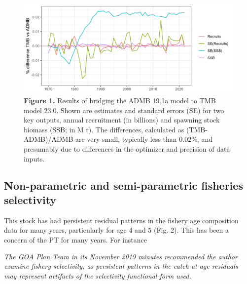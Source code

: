 \documentclass[
]{article}
\begin{document}
\begin{figure}
\centering
\includegraphics{Results/Figure1_time_series_of_se.png}
\caption{\textbf{Figure 1.} Results of bridging the ADMB 19.1a model to
TMB model 23.0. Shown are estimates and standard errors (SE) for two key
outputs, annual recruitment (in billions) and spawning stock biomass
(SSB; in M t). The differences, calculated as (TMB-ADMB)/ADMB are very
small, typically less than 0.02\%, and presumably due to differences in
the optimizer and precision of data inputs.}
\end{figure}

\hypertarget{non-parametric-and-semi-parametric-fisheries-selectivity}{%
\subsection{Non-parametric and semi-parametric fisheries
selectivity}\label{non-parametric-and-semi-parametric-fisheries-selectivity}}

This stock has had persistent residual patterns in the fishery age
composition data for many years, particularly for age 4 and 5 (Fig. 2).
This has been a concern of the PT for many years. For instance

\emph{The GOA Plan Team in its November 2019 minutes recommended the
author examine fishery selectivity, as persistent patterns in the
catch-at-age residuals may represent artifacts of the selectivity
functional form used.}
\end{document}
